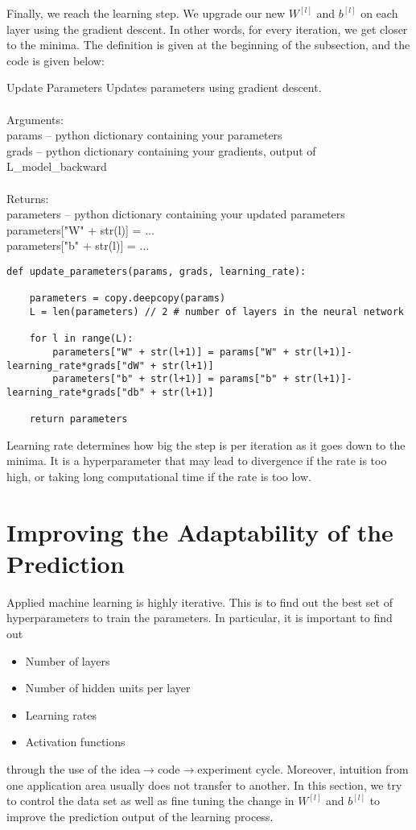 \documentclass[a4paper]{article}
\begin{document}
Finally, we reach the learning step. We upgrade our new $W^{[l]}$ and $b^{[l]}$ on each layer using the gradient descent. In other words, for every iteration, we get closer to the minima. The definition is given at the beginning of the subsection, and the code is given below: 

\begin{alg}{Update Parameters}{} Updates parameters using gradient descent. \\~\\
Arguments: \\
params -- python dictionary containing your parameters \\
grads -- python dictionary containing your gradients, output of L\_model\_backward\\~\\
Returns: \\
parameters -- python dictionary containing your updated parameters \\
parameters["W" + str(l)] = ... \\
parameters["b" + str(l)] = ...\\
\begin{verbatim}
def update_parameters(params, grads, learning_rate):

    parameters = copy.deepcopy(params)
    L = len(parameters) // 2 # number of layers in the neural network

    for l in range(L):
        parameters["W" + str(l+1)] = params["W" + str(l+1)]-learning_rate*grads["dW" + str(l+1)]
        parameters["b" + str(l+1)] = params["b" + str(l+1)]-learning_rate*grads["db" + str(l+1)]

    return parameters
\end{verbatim}
\end{alg}

Learning rate determines how big the step is per iteration as it goes down to the minima. It is a hyperparameter that may lead to divergence if the rate is too high, or taking long computational time if the rate is too low. 

\pagebreak
\section{Improving the Adaptability of the Prediction}
Applied machine learning is highly iterative. This is to find out the best set of hyperparameters to train the parameters. In particular, it is important to find out 
\begin{itemize}
\item Number of layers
\item Number of hidden units per layer
\item Learning rates
\item Activation functions
\end{itemize}
through the use of the idea$\to$code$\to$experiment cycle. Moreover, intuition from one application area usually does not transfer to another. In this section, we try to control the data set as well as fine tuning the change in $W^{[l]}$ and $b^{[l]}$ to improve the prediction output of the learning process. 
\end{document}
